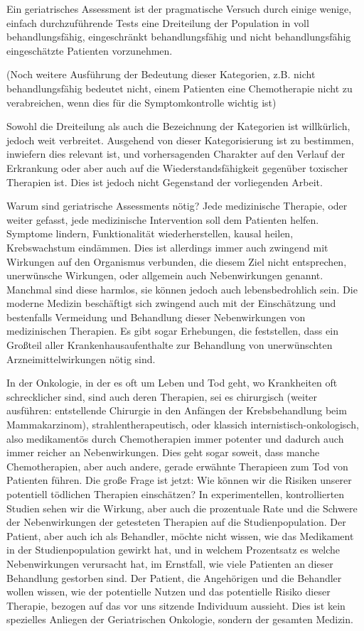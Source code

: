 Ein geriatrisches Assessment ist der pragmatische Versuch durch einige
wenige, einfach durchzuführende Tests eine Dreiteilung der Population
in voll behandlungsfähig, eingeschränkt behandlungsfähig und nicht
behandlungsfähig eingeschätzte Patienten vorzunehmen.

(Noch weitere Ausführung der Bedeutung dieser Kategorien, z.B. nicht
behandlungsfähig bedeutet nicht, einem Patienten eine Chemotherapie
nicht zu verabreichen, wenn dies für die Symptomkontrolle wichtig ist)

Sowohl die Dreiteilung als auch die Bezeichnung der Kategorien ist
willkürlich, jedoch weit verbreitet. Ausgehend von dieser
Kategorisierung ist zu bestimmen, inwiefern dies relevant ist, und
vorhersagenden Charakter auf den Verlauf der Erkrankung oder aber auch
auf die Wiederstandsfähigkeit gegenüber toxischer Therapien ist. Dies
ist jedoch nicht Gegenstand der vorliegenden Arbeit.

Warum sind geriatrische Assessments nötig? Jede medizinische Therapie,
oder weiter gefasst, jede medizinische Intervention soll dem Patienten
helfen. Symptome lindern, Funktionalität wiederherstellen, kausal
heilen, Krebswachstum eindämmen. Dies ist allerdings immer auch
zwingend mit Wirkungen auf den Organismus verbunden, die diesem Ziel
nicht entsprechen, unerwünsche Wirkungen, oder allgemein auch
Nebenwirkungen genannt. Manchmal sind diese harmlos, sie können jedoch
auch lebensbedrohlich sein. Die moderne Medizin beschäftigt sich
zwingend auch mit der Einschätzung und bestenfalls Vermeidung und
Behandlung dieser Nebenwirkungen von medizinischen Therapien. Es gibt
sogar Erhebungen, die feststellen, dass ein Großteil aller
Krankenhausaufenthalte zur Behandlung von unerwünschten
Arzneimittelwirkungen nötig sind.

In der Onkologie, in der es oft um Leben und Tod geht, wo Krankheiten
oft schrecklicher sind, sind auch deren Therapien, sei es chirurgisch
(weiter ausführen: entstellende Chirurgie in den Anfängen der
Krebsbehandlung beim Mammakarzinom), strahlentherapeutisch, oder
klassich internistisch-onkologisch, also medikamentös durch
Chemotherapien immer potenter und dadurch auch immer reicher an
Nebenwirkungen. Dies geht sogar soweit, dass manche Chemotherapien,
aber auch andere, gerade erwähnte Therapieen zum Tod von Patienten
führen. Die große Frage ist jetzt: Wie können wir die Risiken unserer
potentiell tödlichen Therapien einschätzen? In experimentellen,
kontrollierten Studien sehen wir die Wirkung, aber auch die
prozentuale Rate und die Schwere der Nebenwirkungen der getesteten
Therapien auf die Studienpopulation. Der Patient, aber auch ich als
Behandler, möchte nicht wissen, wie das Medikament in der
Studienpopulation gewirkt hat, und in welchem Prozentsatz es welche
Nebenwirkungen verursacht hat, im Ernstfall, wie viele Patienten an
dieser Behandlung gestorben sind. Der Patient, die Angehörigen und die
Behandler wollen wissen, wie der potentielle Nutzen und das
potentielle Risiko dieser Therapie, bezogen auf das vor uns sitzende
Individuum aussieht. Dies ist kein spezielles Anliegen der
Geriatrischen Onkologie, sondern der gesamten Medizin.

